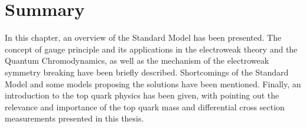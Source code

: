 



\newpage
\section{Summary}
In this chapter, an overview of the Standard Model has been presented. The concept of gauge principle and its
applications in the electroweak theory and the Quantum Chromodynamics, as well as the mechanism of the electroweak
symmetry breaking have been briefly described. Shortcomings of the Standard Model and some models proposing the
solutions have been mentioned. Finally, an introduction to the top quark physics has been given, with pointing out the
relevance and importance of the top quark mass and differential cross section measurements presented in this thesis.

